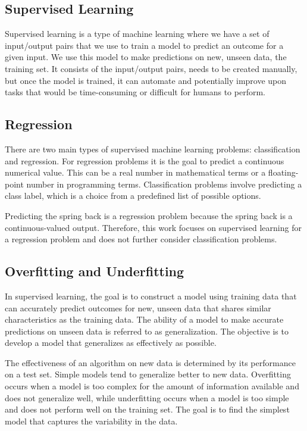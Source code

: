 \subsection{Supervised Learning}\label{subsec:supervised-learning}
Supervised learning is a type of machine learning where we have a set of input/output
pairs that
we use to train a model to predict an outcome for a given input. We use this model to make
predictions on new, unseen data, the training set. It consists of the input/output
pairs, needs
to be created manually, but once the model is trained, it can automate and potentially
improve
upon tasks that would be time-consuming or difficult for humans to perform. \cite[p.
25]{muller_introductionmachinelearning_2016}

\subsection{Regression}\label{subsec:regression}
There are two main types of supervised machine learning problems: classification and
regression.
For regression problems it is the goal to predict a continuous numerical value. This
can be a
real number in mathematical terms or a floating-point number in programming terms.
\cite[p. 226]{muller_introductionmachinelearning_2016}
Classification problems involve predicting a class label, which is a choice from a
predefined
list of possible options. \cite[p. 25]{muller_introductionmachinelearning_2016}

Predicting the spring back is a regression problem because the spring back is a
continuous-valued
output.
Therefore, this work focuses on supervised learning for a regression problem and does
not further
consider classification problems.

\subsection{Overfitting and Underfitting}\label{subsec:overfitting-and-underfitting}
In supervised learning, the goal is to construct a model using training data that can
accurately
predict outcomes for new, unseen data that shares similar characteristics as the
training data.
The ability of a model to make accurate predictions on unseen data is referred to as
generalization. The objective is to develop a model that generalizes as effectively as
possible.
\cite[p. 35]{muller_introductionmachinelearning_2016}

The effectiveness of an algorithm on new data is determined by its performance on a
test set.
Simple models tend to generalize better to new data. Overfitting occurs when a model is
too
complex for the amount of information available and does not generalize well, while
underfitting
occurs when a model is too simple and does not perform well on the training set. The
goal is to
find the simplest model that captures the variability in the data.
\cite[p. 35]{muller_introductionmachinelearning_2016}

